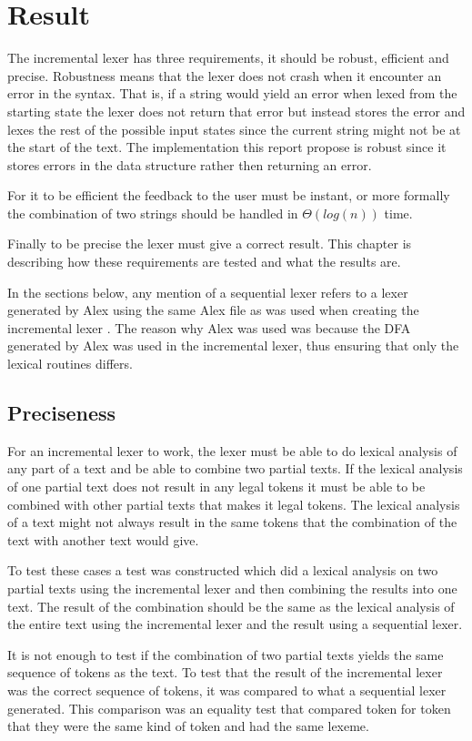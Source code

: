 \chapter{Result}
The incremental lexer has three requirements, it should be
robust, efficient and precise. Robustness means that the lexer does not crash
when it encounter an error in the syntax. That is, if a string would yield an
error when lexed from the starting state the lexer does not return that error but
instead stores the error and lexes the rest of the possible input states since
the current string might not be at the start of the text. The implementation
this report propose is robust since it stores errors in the data structure
rather then returning an error.

For it to be efficient the feedback to the user must be instant, or more
formally the combination of two strings should be handled in $\Theta(log(n))$ time.

Finally to be precise the lexer must give a correct result. This chapter is
describing how these requirements are tested and what the results are.

In the sections below, any mention of a sequential lexer refers to a lexer
generated by Alex using the same Alex file as was used when creating the
incremental lexer \cite{alex}. The reason why Alex was used was because the DFA
generated by Alex was used in the incremental lexer, thus ensuring that only the
lexical routines differs.

\section{Preciseness}
For an incremental lexer to work, the lexer must be able to do lexical analysis
of any part of a text and be able to combine two partial texts. If the lexical
analysis of one partial text does not result in any legal tokens it must be able
to be combined with other partial texts that makes it legal tokens. The lexical
analysis of a text might not always result in the same tokens that the
combination of the text with another text would give.

To test these cases a test was constructed which did a lexical analysis on two
partial texts using the incremental lexer and then combining the results into
one text. The result of the combination should be the same as the lexical
analysis of the entire text using the incremental lexer and the result using a
sequential lexer.

It is not enough to test if the combination of two partial texts yields the
same sequence of tokens as the text. To test that the result of the incremental
lexer was the correct sequence of tokens, it was compared to what a sequential 
lexer generated. This comparison was an equality test that compared token for
token that they were the same kind of token and had the same lexeme.

